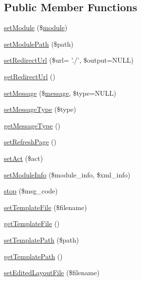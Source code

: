 \subsection*{Public Member Functions}
\begin{DoxyCompactItemize}
\item 
\hyperlink{classModuleObject_a610f40078a4c8590452eaedf794350ed}{set\+Module} (\$\hyperlink{classmodule}{module})
\item 
\hyperlink{classModuleObject_a277cebf9e472c1af7c00eab68414a567}{set\+Module\+Path} (\$path)
\item 
\hyperlink{classModuleObject_ac5126aa7f57a52e7f26b18b9040f5501}{set\+Redirect\+Url} (\$url= './', \$output=N\+U\+L\+L)
\item 
\hyperlink{classModuleObject_ae7c0b4d36f7ef9e8b3ec59a6a9bf6116}{get\+Redirect\+Url} ()
\item 
\hyperlink{classModuleObject_ac0e69111c80e589a4da7899fc7c75fe5}{set\+Message} (\$\hyperlink{classmessage}{message}, \$type=N\+U\+L\+L)
\item 
\hyperlink{classModuleObject_a9f65f760815bb7c6667a2e521578af10}{set\+Message\+Type} (\$type)
\item 
\hyperlink{classModuleObject_aa0c2daa9dda892df56eb5fe7c754e25b}{get\+Message\+Type} ()
\item 
\hyperlink{classModuleObject_a6d0d3436c8c64591e1a3534647714969}{set\+Refresh\+Page} ()
\item 
\hyperlink{classModuleObject_a35d0b9120ea393d4b4177b0c667e198c}{set\+Act} (\$act)
\item 
\hyperlink{classModuleObject_afbcee54b026b35a2a4b4a454724bb9be}{set\+Module\+Info} (\$module\+\_\+info, \$xml\+\_\+info)
\item 
\hyperlink{classModuleObject_ac4c2bac7917c3ab3a0e816b99574727c}{stop} (\$msg\+\_\+code)
\item 
\hyperlink{classModuleObject_aa38e116023d54d3f5d8f507bb87663f4}{set\+Template\+File} (\$filename)
\item 
\hyperlink{classModuleObject_af5456f80bf7bd5d3c20dd6547423a419}{get\+Template\+File} ()
\item 
\hyperlink{classModuleObject_a440407bd8b6b16eb03115ad4a5c5835a}{set\+Template\+Path} (\$path)
\item 
\hyperlink{classModuleObject_a10f29d4a49d7e24bdab4e348633c6609}{get\+Template\+Path} ()
\item 
\hyperlink{classModuleObject_a28e95b299aeac82b450e6ed8b121ff05}{set\+Edited\+Layout\+File} (\$filename)
\item 

\end{DoxyCompactItemize}
